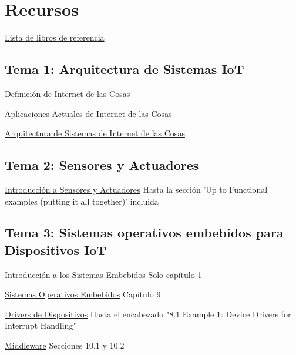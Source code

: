 \documentclass[12pt]{report} %
\begin{document}
\chapter{Recursos}
\href{https://learning.oreilly.com/playlists/5a6c045f-e39c-465e-9e7c-60dcbb12aebb}{Lista de libros de referencia}

\section{Tema 1: Arquitectura de Sistemas IoT}
\href{https://learning.oreilly.com/library/view/internet-of-things/9781788470599/a7f866bd-4ac8-47f3-a175-0f10d91a5ce2.xhtml}{Definición de Internet de las Cosas}

\href{https://learning.oreilly.com/library/view/internet-of-things/9781119456742/part04.xhtml\#part}{Aplicaciones Actuales de Internet de las Cosas}

\href{https://learning.oreilly.com/library/view/build-your-own/9781484244982/html/474034_1_En_2_Chapter.xhtml}{Arquitectura de Sistemas de Internet de las Cosas}

\section{Tema 2: Sensores y Actuadores}
\href{https://learning.oreilly.com/library/view/internet-of-things/9781788470599/d39be056-b166-476e-868e-c415e4dfa886.xhtml}{Introducción a Sensores y Actuadores} Hasta la sección 'Up to Functional examples (putting it all together)' incluida

\section{Tema 3: Sistemas operativos embebidos para Dispositivos IoT}
\href{https://learning.oreilly.com/library/view/embedded-systems-architecture/9780123821966/xhtml/CHP001.html#CHP001titl}{Introducción a los Sistemas Embebidos} Solo capítulo 1

\href{https://learning.oreilly.com/library/view/embedded-systems-architecture/9780123821966/xhtml/CHP009.html#CHP009titl}{Sistemas Operativos Embebidos} Capítulo 9

\href{https://learning.oreilly.com/library/view/embedded-systems-architecture/9780123821966/xhtml/CHP008.html#CHP008titl}{Drivers de Dispositivos} Hasta el encabezado "8.1 Example 1: Device Drivers for Interrupt Handling"

\href{https://learning.oreilly.com/library/view/embedded-systems-architecture/9780123821966/xhtml/CHP010.html#CHP010titl}{Middleware} Secciones 10.1 y 10.2
\end{document}
